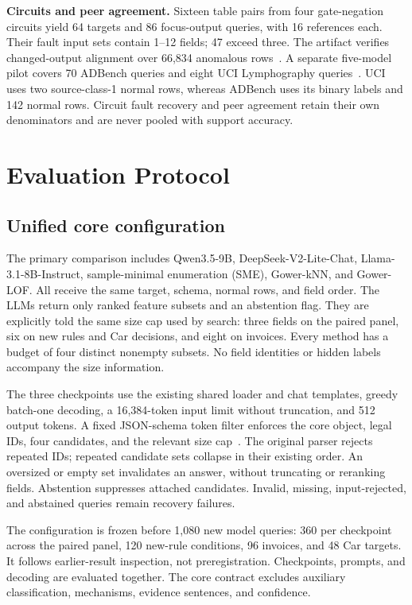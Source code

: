 \documentclass[conference]{IEEEtran}
\begin{document}
\textbf{Circuits and peer agreement.} Sixteen table pairs from four gate-negation circuits yield 64 targets and 86 focus-output queries, with 16 references each. Their fault input sets contain 1--12 fields; 47 exceed three. The artifact verifies changed-output alignment over 66,834 anomalous rows~\cite{antwarg2024groundtruth}. A separate five-model pilot covers 70 ADBench queries and eight UCI Lymphography queries~\cite{han2022adbench,zwitter1988lymphography}. UCI uses two source-class-1 normal rows, whereas ADBench uses its binary labels and 142 normal rows. Circuit fault recovery and peer agreement retain their own denominators and are never pooled with support accuracy.

\section{Evaluation Protocol}
\subsection{Unified core configuration}
The primary comparison includes Qwen3.5-9B, DeepSeek-V2-Lite-Chat, Llama-3.1-8B-Instruct, sample-minimal enumeration (SME), Gower-kNN, and Gower-LOF. All receive the same target, schema, normal rows, and field order. The LLMs return only ranked feature subsets and an abstention flag. They are explicitly told the same size cap used by search: three fields on the paired panel, six on new rules and Car decisions, and eight on invoices. Every method has a budget of four distinct nonempty subsets. No field identities or hidden labels accompany the size information.

The three checkpoints use the existing shared loader and chat templates, greedy batch-one decoding, a 16,384-token input limit without truncation, and 512 output tokens. A fixed JSON-schema token filter enforces the core object, legal IDs, four candidates, and the relevant size cap~\cite{lmfe2026}. The original parser rejects repeated IDs; repeated candidate sets collapse in their existing order. An oversized or empty set invalidates an answer, without truncating or reranking fields. Abstention suppresses attached candidates. Invalid, missing, input-rejected, and abstained queries remain recovery failures.

The configuration is frozen before 1,080 new model queries: 360 per checkpoint across the paired panel, 120 new-rule conditions, 96 invoices, and 48 Car targets. It follows earlier-result inspection, not preregistration. Checkpoints, prompts, and decoding are evaluated together. The core contract excludes auxiliary classification, mechanisms, evidence sentences, and confidence.
\end{document}
